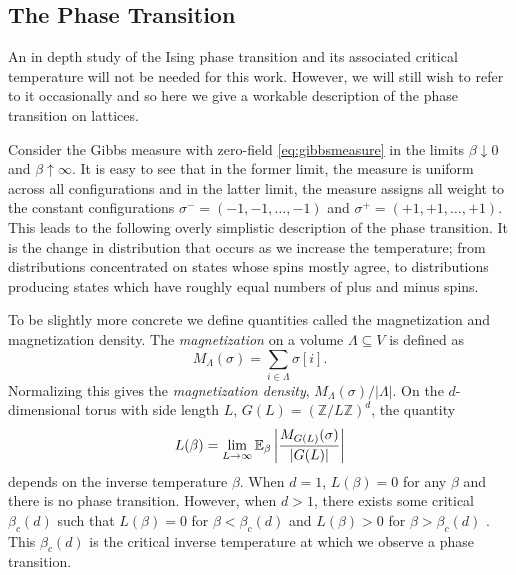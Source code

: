 	\subsection{The Phase Transition}
	An in depth study of the Ising phase transition and its associated critical temperature will not be needed for this work. However, we will still wish to refer to it occasionally and so here we give a workable description of the phase transition on lattices.

	Consider the Gibbs measure with zero-field \eqref{eq:gibbsmeasure} in the limits $\beta \downarrow 0$ and $\beta \uparrow \infty$. It is easy to see that in the former limit, the measure is uniform across all configurations and in the latter limit, the measure assigns all weight to the constant configurations $\sigma^- = (-1, -1, \dots, -1)$ and $\sigma^+ = (+1, +1, \dots, +1)$. This leads to the following overly simplistic description of the phase transition. It is the change in distribution that occurs as we increase the temperature; from distributions concentrated on states whose spins mostly agree, to distributions producing states which have roughly equal numbers of plus and minus spins.

	To be slightly more concrete we define quantities called the magnetization and magnetization density. The \emph{magnetization} on a volume $\Lambda \subseteq V$ is defined as 
	\begin{equation}
		M_\Lambda(\sigma) = \sum_{i \in \Lambda} \sigma[i].
	\end{equation}
	Normalizing this gives the \emph{magnetization density}, $M_\Lambda(\sigma)/|\Lambda|$. On the $d$-dimensional torus with side length $L$, $G(L) = (\mathbb{Z}/L\mathbb{Z})^d$, the quantity
	\begin{equation}
		L(\beta) = \lim_{L \rightarrow \infty} \mathbb{E}_\beta \left|\frac{M_{G(L)}(\sigma)}{|G(L)|} \right|
		\label{eq:limitmagnetizationdensity}
	\end{equation}
	depends on the inverse temperature $\beta$. When $d = 1$, $L(\beta) = 0$ for any $\beta$ and there is no phase transition. However, when $d > 1$, there exists some critical $\beta_c(d)$ such that $L(\beta) = 0$ for $\beta < \beta_c(d)$ and $L(\beta) > 0$ for $\beta > \beta_c(d)$ \cite{Friedli2017-xm}. This $\beta_c(d)$ is the critical inverse temperature at which we observe a phase transition.


